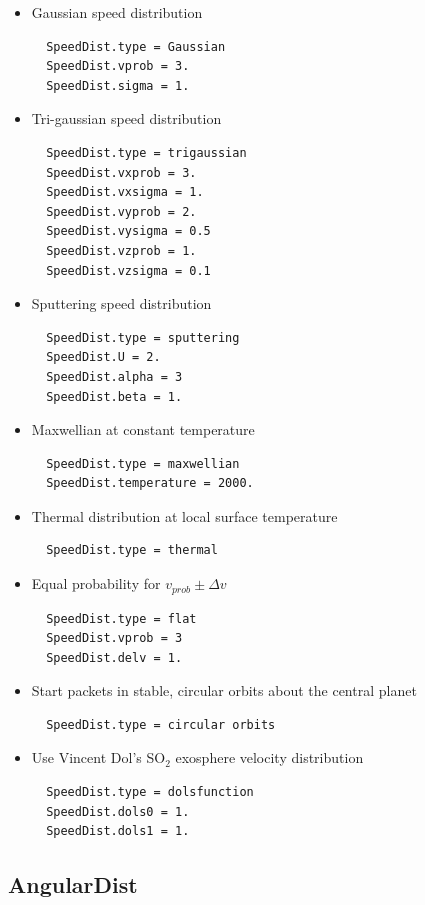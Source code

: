\documentclass[11pt]{article}
\begin{document}
\begin{itemize}
\item Gaussian speed distribution
  \begin{verbatim}
  SpeedDist.type = Gaussian
  SpeedDist.vprob = 3.
  SpeedDist.sigma = 1.
  \end{verbatim}
\item Tri-gaussian speed distribution
  \begin{verbatim}
  SpeedDist.type = trigaussian
  SpeedDist.vxprob = 3.
  SpeedDist.vxsigma = 1.
  SpeedDist.vyprob = 2.
  SpeedDist.vysigma = 0.5
  SpeedDist.vzprob = 1.
  SpeedDist.vzsigma = 0.1
  \end{verbatim}
\item Sputtering speed distribution
  \begin{verbatim}
  SpeedDist.type = sputtering
  SpeedDist.U = 2.
  SpeedDist.alpha = 3
  SpeedDist.beta = 1.
  \end{verbatim}
\item Maxwellian at constant temperature
  \begin{verbatim}
  SpeedDist.type = maxwellian
  SpeedDist.temperature = 2000.
  \end{verbatim}
\item Thermal distribution at local surface temperature
  \begin{verbatim}
  SpeedDist.type = thermal
  \end{verbatim}
\item Equal probability for $v_{prob} \pm \Delta v$
  \begin{verbatim}
  SpeedDist.type = flat
  SpeedDist.vprob = 3
  SpeedDist.delv = 1.
  \end{verbatim}
\item Start packets in stable, circular orbits about the central planet
  \begin{verbatim}
  SpeedDist.type = circular orbits
  \end{verbatim}
\item Use Vincent Dol's SO$_2$ exosphere velocity distribution
  \begin{verbatim}
  SpeedDist.type = dolsfunction
  SpeedDist.dols0 = 1.
  SpeedDist.dols1 = 1.
  \end{verbatim}
\end{itemize}

\subsection{AngularDist}
\end{document}
